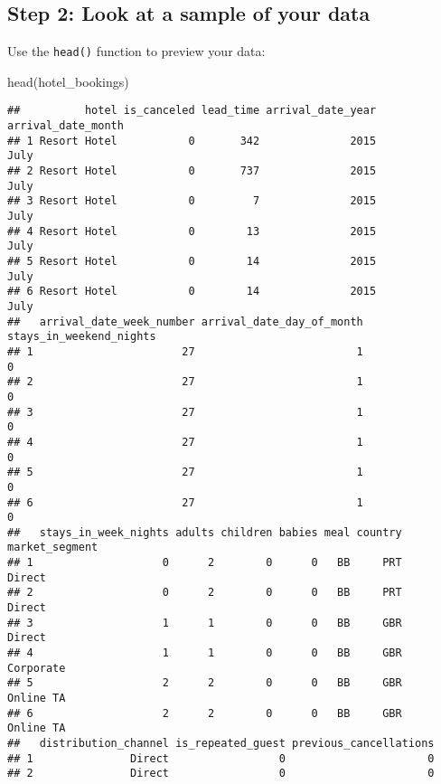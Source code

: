 \documentclass[
]{article}
\newenvironment{Shaded}{\begin{snugshade}}{\end{snugshade}}
\newcommand{\FunctionTok}[1]{\textcolor[rgb]{0.00,0.00,0.00}{#1}}
\newcommand{\NormalTok}[1]{#1}
\begin{document}
\hypertarget{step-2-look-at-a-sample-of-your-data}{%
\subsection{Step 2: Look at a sample of your
data}\label{step-2-look-at-a-sample-of-your-data}}

Use the \texttt{head()} function to preview your data:

\begin{Shaded}
\begin{Highlighting}[]
\FunctionTok{head}\NormalTok{(hotel\_bookings)}
\end{Highlighting}
\end{Shaded}

\begin{verbatim}
##          hotel is_canceled lead_time arrival_date_year arrival_date_month
## 1 Resort Hotel           0       342              2015               July
## 2 Resort Hotel           0       737              2015               July
## 3 Resort Hotel           0         7              2015               July
## 4 Resort Hotel           0        13              2015               July
## 5 Resort Hotel           0        14              2015               July
## 6 Resort Hotel           0        14              2015               July
##   arrival_date_week_number arrival_date_day_of_month stays_in_weekend_nights
## 1                       27                         1                       0
## 2                       27                         1                       0
## 3                       27                         1                       0
## 4                       27                         1                       0
## 5                       27                         1                       0
## 6                       27                         1                       0
##   stays_in_week_nights adults children babies meal country market_segment
## 1                    0      2        0      0   BB     PRT         Direct
## 2                    0      2        0      0   BB     PRT         Direct
## 3                    1      1        0      0   BB     GBR         Direct
## 4                    1      1        0      0   BB     GBR      Corporate
## 5                    2      2        0      0   BB     GBR      Online TA
## 6                    2      2        0      0   BB     GBR      Online TA
##   distribution_channel is_repeated_guest previous_cancellations
## 1               Direct                 0                      0
## 2               Direct                 0                      0

\end{verbatim}
\end{document}
